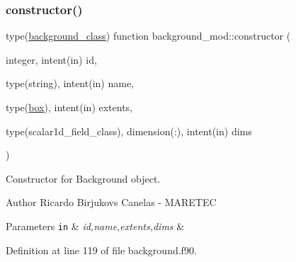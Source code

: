 \subsubsection{\texorpdfstring{constructor()}{constructor()}}
{\footnotesize\ttfamily type(\mbox{\hyperlink{structbackground__mod_1_1background__class}{background\+\_\+class}}) function background\+\_\+mod\+::constructor (\begin{DoxyParamCaption}\item[{integer, intent(in)}]{id,  }\item[{type(string), intent(in)}]{name,  }\item[{type(\mbox{\hyperlink{structgeometry__mod_1_1box}{box}}), intent(in)}]{extents,  }\item[{type(scalar1d\+\_\+field\+\_\+class), dimension(\+:), intent(in)}]{dims }\end{DoxyParamCaption})\hspace{0.3cm}{\ttfamily [private]}}



Constructor for Background object. 

\begin{DoxyAuthor}{Author}
Ricardo Birjukovs Canelas -\/ M\+A\+R\+E\+T\+EC 
\end{DoxyAuthor}

\begin{DoxyParams}[1]{Parameters}
\mbox{\tt in}  & {\em id,name,extents,dims} & \\
\hline
\end{DoxyParams}


Definition at line 119 of file background.\+f90.


